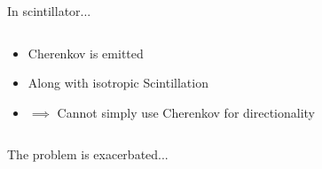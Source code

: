 \documentclass[14pt]{beamer}
\begin{document}
\begin{frame}{In scintillator...}
\begin{columns}[T]
\begin{column}{0.5\linewidth}
			\begin{block}{}
				\begin{itemize}
					\item<3-> Cherenkov is emitted
					\item<4-> Along with isotropic Scintillation
					\item<5-> {\color{red}$\implies$ Cannot simply use Cherenkov
						for directionality}
				\end{itemize}
			\end{block}
		\end{column}
	\end{columns}
\end{frame}

\begin{frame}{The problem is exacerbated...}

\end{frame}
\end{document}
